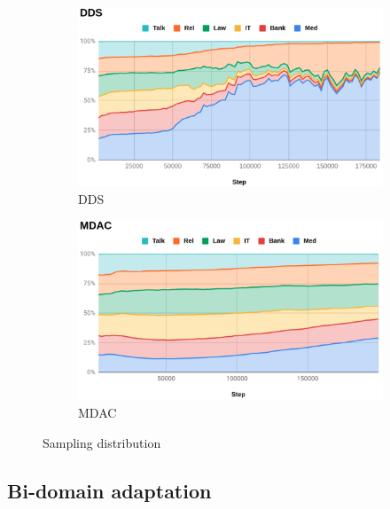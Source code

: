 \documentclass[11pt]{article}
\begin{document}
\begin{figure}[htbp]
\begin{subfigure}{.5\textwidth}
  \centering
  \includegraphics[width=.8\linewidth]{DDS.png}  
  \caption{DDS}
  \label{fig:DDS}
\end{subfigure}
\begin{subfigure}{.5\textwidth}
  \centering
  \includegraphics[width=.8\linewidth]{MDAC.png}  
  \caption{MDAC}
  \label{fig:MDAC}
\end{subfigure}
\caption{Sampling distribution}
\label{fig:sampling}
\end{figure}

\subsection{Bi-domain adaptation}\label{ssec:bida}
\end{document}
